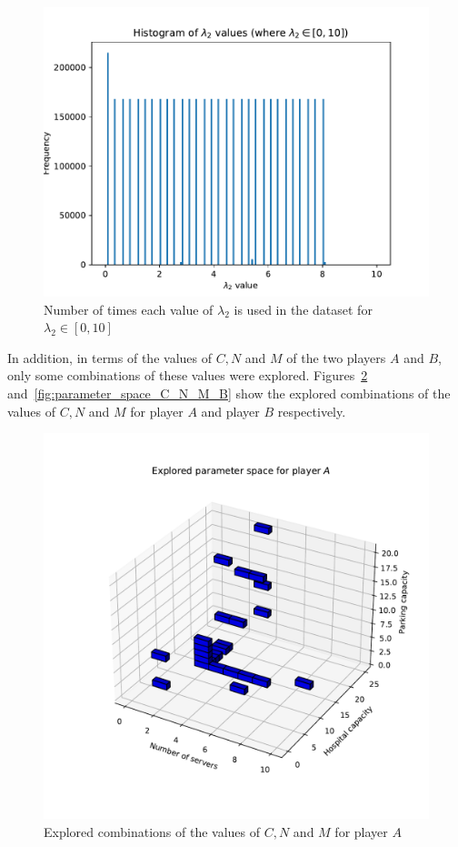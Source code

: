 \begin{figure}[H]
    \centering
    \includegraphics[width=\linewidth]{chapters/05_numerical_results/Bin/descriptive/lambda_2_histogram_0_10.pdf}
    \caption{Number of times each value of \(\lambda_2\) is used in the dataset
        for \(\lambda_2 \in [0, 10]\)}
    \label{fig:data_description_lambda_2_0_10}
\end{figure}

In addition, in terms of the values of \(C, N\) and \(M\) of the two players
\(A\) and \(B\), only some combinations of these values were explored.
Figures~\ref{fig:parameter_space_C_N_M_A} and~\ref{fig:parameter_space_C_N_M_B}
show the explored combinations of the values of \(C, N\) and \(M\) for player
\(A\) and player \(B\) respectively.

\begin{figure}[H]
    \centering
    \includegraphics[width=\linewidth]{chapters/05_numerical_results/Bin/descriptive/explored_parameters_1.pdf}
    \caption{Explored combinations of the values of \(C, N\) and \(M\) for
    player \(A\)}
    \label{fig:parameter_space_C_N_M_A}
\end{figure}

